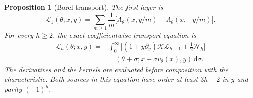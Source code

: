\documentclass[a4paper,10pt]{article}
\numberwithin{equation}{section}
\newcommand{\dd}{\mathrm{d}}
\theoremstyle{paperplain}
\newtheorem{prp}[thm]{Proposition}
\theoremstyle{paperremark}
\theoremstyle{paperplain}
\begin{document}
\begin{prp}[Borel transport]\label{prp:s07:borel-transport}
The first layer is
\begin{equation}\label{eq:s07:borel-one}
 \mathcal L_1(\theta;x,y)
 =\sum_{m\geq1}\frac1m
       \bigl[\Lambda_\theta(x,y/m)-\Lambda_\theta(x,-y/m)\bigr].
\end{equation}
For every $h\geq2$, the exact coefficientwise transport equation is
\begin{equation}\label{eq:s07:borel-transport}
 \begin{aligned}
 \mathcal L_h(\theta;x,y)
 ={}&\int_0^\infty\bigl[(1+y\partial_y)
                               \mathcal K\mathcal L_{h-1}
                      +\tfrac12\mathcal N_h\bigr]\\
 &\quad(\theta+\sigma;
                  x+\sigma v_\theta(x),y)\,\dd\sigma.
 \end{aligned}
\end{equation}
The derivatives and the kernels are evaluated before composition
with the characteristic. Both sources in this equation have order
at least $3h-2$ in $y$ and parity $(-1)^h$.
\end{prp}
\end{document}
